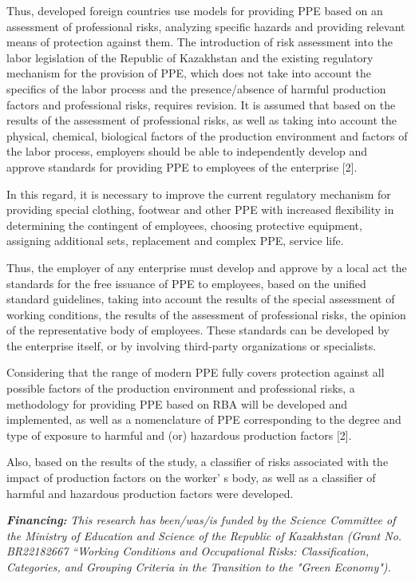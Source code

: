 \begin{multicols}{2}
Thus, developed foreign countries use models for providing PPE based on
an assessment of professional risks, analyzing specific hazards and
providing relevant means of protection against them. The introduction of
risk assessment into the labor legislation of the Republic of Kazakhstan
and the existing regulatory mechanism for the provision of PPE, which
does not take into account the specifics of the labor process and the
presence/absence of harmful production factors and professional risks,
requires revision. It is assumed that based on the results of the
assessment of professional risks, as well as taking into account the
physical, chemical, biological factors of the production environment and
factors of the labor process, employers should be able to independently
develop and approve standards for providing PPE to employees of the
enterprise {[}2{]}.

In this regard, it is necessary to improve the current regulatory
mechanism for providing special clothing, footwear and other PPE with
increased flexibility in determining the contingent of employees,
choosing protective equipment, assigning additional sets, replacement
and complex PPE, service life.

Thus, the employer of any enterprise must develop and approve by a local
act the standards for the free issuance of PPE to employees, based on
the unified standard guidelines, taking into account the results of the
special assessment of working conditions, the results of the assessment
of professional risks, the opinion of the representative body of
employees. These standards can be developed by the enterprise itself, or
by involving third-party organizations or specialists.

Considering that the range of modern PPE fully covers protection against
all possible factors of the production environment and professional
risks, a methodology for providing PPE based on RBA will be developed
and implemented, as well as a nomenclature of PPE corresponding to the
degree and type of exposure to harmful and (or) hazardous production
factors {[}2{]}.

Also, based on the results of the study, a classifier of risks
associated with the impact of production factors on the
worker' s body, as well as a classifier of harmful and
hazardous production factors were developed.

\emph{{\bfseries Financing:}} \emph{This research has been/was/is funded by
the Science Committee of the Ministry of Education and Science of the
Republic of Kazakhstan (Grant No. BR22182667 ``Working Conditions and
Occupational Risks: Classification, Categories, and Grouping Criteria in
the Transition to the "Green Economy").}
\end{multicols}

